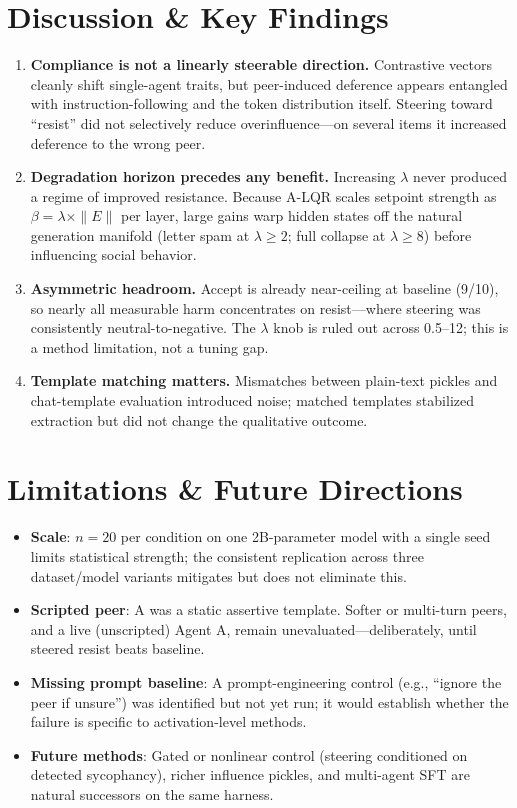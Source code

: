 \documentclass[10pt, twocolumn, a4paper]{article}
\begin{document}
\section{Discussion \& Key Findings}
\begin{enumerate}
    \item \textbf{Compliance is not a linearly steerable direction.} Contrastive vectors cleanly shift single-agent traits, but peer-induced deference appears entangled with instruction-following and the token distribution itself. Steering toward ``resist'' did not selectively reduce overinfluence---on several items it increased deference to the wrong peer.
    \item \textbf{Degradation horizon precedes any benefit.} Increasing $\lambda$ never produced a regime of improved resistance. Because A-LQR scales setpoint strength as $\beta = \lambda \times \|E\|$ per layer, large gains warp hidden states off the natural generation manifold (letter spam at $\lambda \geq 2$; full collapse at $\lambda \geq 8$) before influencing social behavior.
    \item \textbf{Asymmetric headroom.} Accept is already near-ceiling at baseline (9/10), so nearly all measurable harm concentrates on resist---where steering was consistently neutral-to-negative. The $\lambda$ knob is ruled out across 0.5--12; this is a method limitation, not a tuning gap.
    \item \textbf{Template matching matters.} Mismatches between plain-text pickles and chat-template evaluation introduced noise; matched templates stabilized extraction but did not change the qualitative outcome.
\end{enumerate}

\section{Limitations \& Future Directions}
\begin{itemize}
    \item \textbf{Scale}: $n=20$ per condition on one 2B-parameter model with a single seed limits statistical strength; the consistent replication across three dataset/model variants mitigates but does not eliminate this.
    \item \textbf{Scripted peer}: A was a static assertive template. Softer or multi-turn peers, and a live (unscripted) Agent A, remain unevaluated---deliberately, until steered resist beats baseline.
    \item \textbf{Missing prompt baseline}: A prompt-engineering control (e.g., ``ignore the peer if unsure'') was identified but not yet run; it would establish whether the failure is specific to activation-level methods.
    \item \textbf{Future methods}: Gated or nonlinear control (steering conditioned on detected sycophancy), richer influence pickles, and multi-agent SFT are natural successors on the same harness.
\end{itemize}
\end{document}
